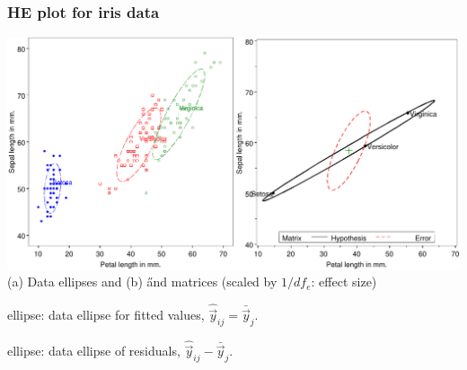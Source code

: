   \begin{frame}
	\frametitle{HE plot for iris data}

  \begin{center}
	\includegraphics[width=.9\textwidth,clip]{fig/heplot31}
	\\ (a) Data ellipses and (b) \H and \E matrices (scaled by $1/df_e$: effect size)
  \end{center}
  \begin{itemize*}
  	\item {} ellipse:  data ellipse for fitted values, $\hat{\vec{y}}_{ij} =
	\bar{\vec{y}}_j$.
	\item {} ellipse:  data ellipse of residuals, $\hat{\vec{y}}_{ij} -
	\bar{\vec{y}}_j$.
  \end{itemize*}
  \end{frame}



